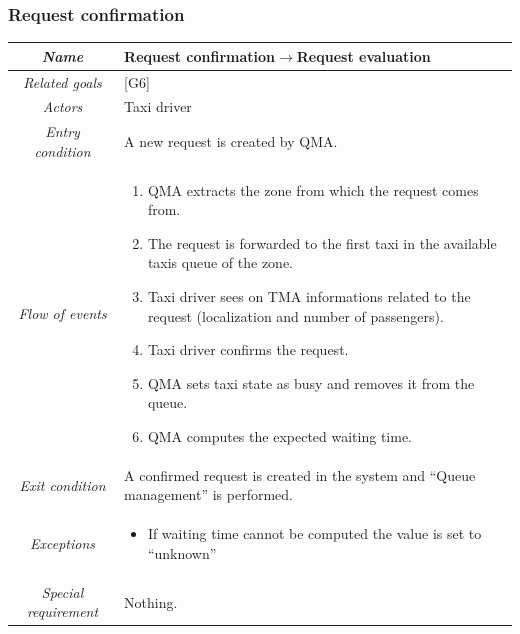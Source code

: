 \clearpage{}


\subsubsection{Request confirmation}

\begin{flushleft}
\begin{tabular}{c|>{\centering}p{10cm}}
\hline 
\emph{Name} & \raggedright{}Request confirmation$\rightarrow$Request evaluation\tabularnewline
\hline 
\emph{Related goals} & \raggedright{}{[}G6{]}\tabularnewline
\hline 
\emph{Actors} & \raggedright{}Taxi driver\tabularnewline
\hline 
\emph{Entry condition} & \raggedright{}A new request is created by QMA.\tabularnewline
\hline 
\emph{Flow of events} & \begin{enumerate}
\item \begin{raggedright}
QMA extracts the zone from which the request comes from.
\par\end{raggedright}
\item \begin{raggedright}
The request is forwarded to the first taxi in the available taxis
queue of the zone.
\par\end{raggedright}
\item \begin{raggedright}
Taxi driver sees on TMA informations related to the request (localization
and number of passengers).
\par\end{raggedright}
\item \begin{raggedright}
Taxi driver confirms the request.
\par\end{raggedright}
\item \begin{raggedright}
QMA sets taxi state as busy and removes it from the queue.
\par\end{raggedright}
\item \raggedright{}QMA computes the expected waiting time.\end{enumerate}
\tabularnewline
\hline 
\emph{Exit condition} & \raggedright{}A confirmed request is created in the system and ``Queue
management'' is performed.\tabularnewline
\hline 
\emph{Exceptions} & \begin{itemize}
\item \raggedright{}If waiting time cannot be computed the value is set
to ``unknown''\end{itemize}
\tabularnewline
\hline 
\emph{Special requirement} & \raggedright{}Nothing.\tabularnewline
\hline 
\end{tabular}
\par\end{flushleft}

